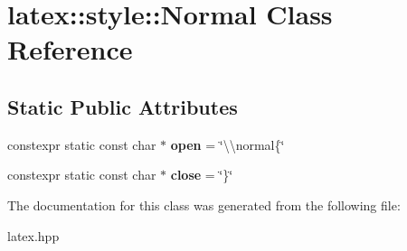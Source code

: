 \hypertarget{classlatex_1_1style_1_1Normal}{\section{latex\-:\-:style\-:\-:Normal Class Reference}
\label{classlatex_1_1style_1_1Normal}
}
\subsection*{Static Public Attributes}
\begin{DoxyCompactItemize}
\item 
\hypertarget{classlatex_1_1style_1_1Normal_ab91741000604603ad79213748fb365d0}{constexpr static const char $\ast$ {\bfseries open} = \char`\"{}\textbackslash{}\textbackslash{}normal\{\char`\"{}}\label{classlatex_1_1style_1_1Normal_ab91741000604603ad79213748fb365d0}

\item 
\hypertarget{classlatex_1_1style_1_1Normal_abc6bcd5cfedf7007237468bad885fa6a}{constexpr static const char $\ast$ {\bfseries close} = \char`\"{}\}\char`\"{}}\label{classlatex_1_1style_1_1Normal_abc6bcd5cfedf7007237468bad885fa6a}

\end{DoxyCompactItemize}


The documentation for this class was generated from the following file\-:\begin{DoxyCompactItemize}
\item 
latex.\-hpp\end{DoxyCompactItemize}
